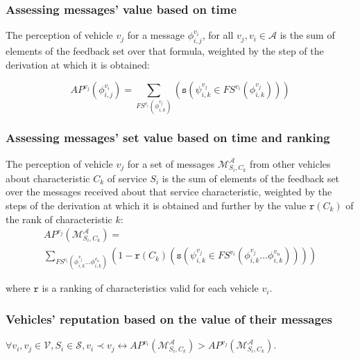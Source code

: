 \documentclass{beamer}
\begin{document}
\begin{frame}
\label{perception}
\frametitle{Assessing messages' value based on time}
\smallskip

\begin{definition}
The perception of vehicle $v_{j}$ for a message $\phi^{v_{i}}_{i,j}$, for all $v_{j}, v_{i} \in \mathcal{A}$ is the sum of elements of the feedback set over that formula, weighted by the step of the derivation at which it is obtained:

\[
AP^{v_{j}}(\phi^{v_{i}}_{i,j})=\sum_{FS^{v_{i}}(\phi^{v_{j}}_{i,k})}(\mathtt{s}(\psi^{v_{j}}_{i,k} \in FS^{v_{i}}(\phi^{v_{j}}_{i,k})))
\]

\end{definition}

\end{frame}


\begin{frame}
\label{perception2}
\frametitle{Assessing messages' set value based on time and ranking}
\smallskip

\begin{definition}
The perception of vehicle $v_{j}$ for a set of messages $\mathcal{M}^{\mathcal{A}}_{S_{i},C_{k}}$ from other vehicles about characteristic $C_{k}$ of service $S_{i}$ is the sum of elements of the feedback set over the messages received about that service characteristic, weighted by the steps of the derivation at which it is obtained and further by the value $\mathtt{r}(C_{k})$ of the rank of characteristic $k$:
%
\begin{displaymath}
\begin{array}{l}
AP^{v_{j}}(\mathcal{M}^{\mathcal{A}}_{S_{i}, C_{k}})=\\
\sum_{FS^{v_{i}}(\phi^{v_{j}}_{i,k}\dots \phi^{v_{n}}_{i,k})}
(1-\mathtt{r}(C_{k})(\mathtt{s}(\psi^{v_{j}}_{i,k} \in FS^{v_{i}}(\phi^{v_{j}}_{i,k}\dots \phi^{v_{n}}_{i,k}))))
\end{array}
\end{displaymath}
\end{definition}

where $\mathtt{r}$ is a ranking of characteristics valid for each vehicle $v_{i}$.
\end{frame}



\begin{frame}
\label{reputation}
\frametitle{Vehicles' reputation based on the value of their messages}
\smallskip

\begin{definition}[Reputation]
$\forall v_{i}, v_{j}\in \mathcal{V}, S_{i}\in \mathcal{S}, v_{i}\prec v_{j} \leftrightarrow AP^{v_{i}}(\mathcal{M}^{\mathcal{A}}_{S_{i}, C_{k}})>AP^{v_{j}}(\mathcal{M}^{\mathcal{A}}_{S_{i}, C_{k}})$.
\end{definition}

\end{frame}
\end{document}
